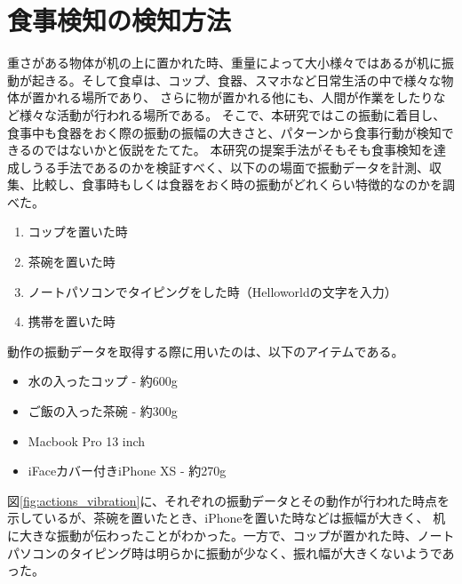 \section{食事検知の検知方法}

重さがある物体が机の上に置かれた時、重量によって大小様々ではあるが机に振動が起きる。そして食卓は、コップ、食器、スマホなど日常生活の中で様々な物体が置かれる場所であり、
さらに物が置かれる他にも、人間が作業をしたりなど様々な活動が行われる場所である。
そこで、本研究ではこの振動に着目し、食事中も食器をおく際の振動の振幅の大きさと、パターンから食事行動が検知できるのではないかと仮説をたてた。
本研究の提案手法がそもそも食事検知を達成しうる手法であるのかを検証すべく、以下のの場面で振動データを計測、収集、比較し、食事時もしくは食器をおく時の振動がどれくらい特徴的なのかを調べた。

\begin{enumerate}
  \item コップを置いた時
  \item 茶碗を置いた時
  \item ノートパソコンでタイピングをした時（Helloworldの文字を入力）
  \item 携帯を置いた時
\end{enumerate}

動作の振動データを取得する際に用いたのは、以下のアイテムである。

\begin{itemize}
  \item 水の入ったコップ - 約600g
  \item ご飯の入った茶碗 - 約300g
  \item Macbook Pro 13 inch
  \item iFaceカバー付きiPhone XS - 約270g
\end{itemize}

図\ref{fig:actions_vibration}に、それぞれの振動データとその動作が行われた時点を示しているが、茶碗を置いたとき、iPhoneを置いた時などは振幅が大きく、
机に大きな振動が伝わったことがわかった。一方で、コップが置かれた時、ノートパソコンのタイピング時は明らかに振動が少なく、振れ幅が大きくないようであった。


